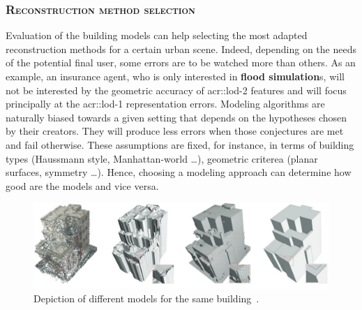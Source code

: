         \subsubsection{\textsc{Reconstruction method selection}}
            Evaluation of the building models can help selecting the most adapted reconstruction methods for a certain urban scene.
            Indeed, depending on the needs of the potential final user, some errors are to be watched more than others.
            As an example, an insurance agent, who is only interested in \textbf{flood simulation}s, will not be interested by the geometric accuracy of \gls{acr::lod}-2 features and will focus principally at the \gls{acr::lod}-1 representation errors.
            Modeling algorithms are naturally biased towards a given setting that depends on the hypotheses chosen by their creators.
            They will produce less errors when those conjectures are met and fail otherwise.
            These assumptions are fixed, for instance, in terms of building types (Haussmann style, Manhattan-world \dots), geometric criterea (planar surfaces, symmetry \dots).
            Hence, choosing a modeling approach can determine how good are the models and vice versa.
            \begin{figure}[htpb]
                \centering
                \includegraphics[width=.7\textwidth]{images/introduction/use/comparison_li}
                \caption{\label{fig::comparison} Depiction of different models for the same building~\parencite{li2016manhattan}.}
            \end{figure}

